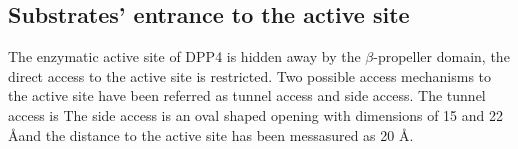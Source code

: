 \subsection{Substrates' entrance to the active site}

The enzymatic active site of DPP4 is hidden away by the $\beta$-propeller domain, the direct access to the active site is restricted. Two possible access mechanisms to the active site have been referred as tunnel access and side access. The tunnel access is The side access is an oval shaped opening with dimensions of 15 and 22 \AA and the distance to the active site has been messasured as 20 \AA.~\cite{Engel_2003}